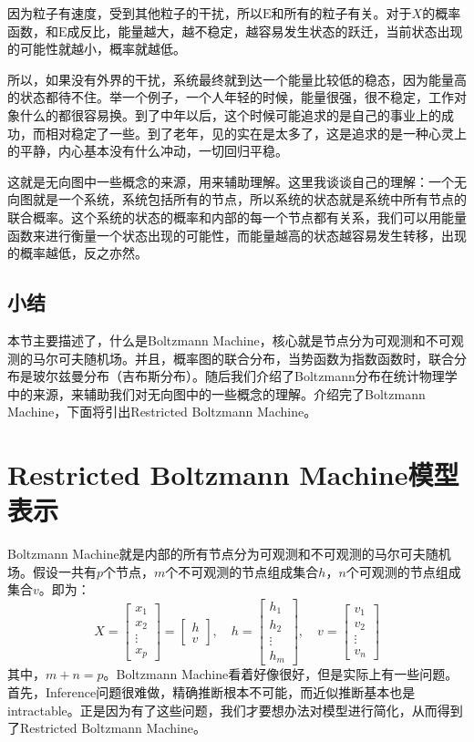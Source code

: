 \documentclass[a4paper]{article}
\begin{document}
因为粒子有速度，受到其他粒子的干扰，所以$\mathrm{E}$和所有的粒子有关。对于$X$的概率函数，和$\mathrm{E}$成反比，能量越大，越不稳定，越容易发生状态的跃迁，当前状态出现的可能性就越小，概率就越低。

所以，如果没有外界的干扰，系统最终就到达一个能量比较低的稳态，因为能量高的状态都待不住。举一个例子，一个人年轻的时候，能量很强，很不稳定，工作对象什么的都很容易换。到了中年以后，这个时候可能追求的是自己的事业上的成功，而相对稳定了一些。到了老年，见的实在是太多了，这是追求的是一种心灵上的平静，内心基本没有什么冲动，一切回归平稳。

这就是无向图中一些概念的来源，用来辅助理解。这里我谈谈自己的理解：一个无向图就是一个系统，系统包括所有的节点，所以系统的状态就是系统中所有节点的联合概率。这个系统的状态的概率和内部的每一个节点都有关系，我们可以用能量函数来进行衡量一个状态出现的可能性，而能量越高的状态越容易发生转移，出现的概率越低，反之亦然。

\subsection{小结}
本节主要描述了，什么是Boltzmann Machine，核心就是节点分为可观测和不可观测的马尔可夫随机场。并且，概率图的联合分布，当势函数为指数函数时，联合分布是玻尔兹曼分布（吉布斯分布）。随后我们介绍了Boltzmann分布在统计物理学中的来源，来辅助我们对无向图中的一些概念的理解。介绍完了Boltzmann Machine，下面将引出Restricted Boltzmann Machine。

\section{Restricted Boltzmann Machine模型表示}
Boltzmann Machine就是内部的所有节点分为可观测和不可观测的马尔可夫随机场。假设一共有$p$个节点，$m$个不可观测的节点组成集合$h$，$n$个可观测的节点组成集合$v$。即为：
\begin{equation}
    X = \begin{bmatrix}
    x_1 \\
    x_2 \\
    \vdots \\
    x_p
    \end{bmatrix}
    = 
    \begin{bmatrix}
    h \\
    v
    \end{bmatrix}
    ,\quad
    h = 
    \begin{bmatrix}
    h_1 \\
    h_2\\
    \vdots \\
    h_m
    \end{bmatrix}
    ,\quad
    v = 
    \begin{bmatrix}
    v_1 \\
    v_2\\
    \vdots \\
    v_n
    \end{bmatrix}
\end{equation}
其中，$m+n=p$。Boltzmann Machine看着好像很好，但是实际上有一些问题。首先，Inference问题很难做，精确推断根本不可能，而近似推断基本也是intractable。正是因为有了这些问题，我们才要想办法对模型进行简化，从而得到了Restricted Boltzmann Machine。
\end{document}
